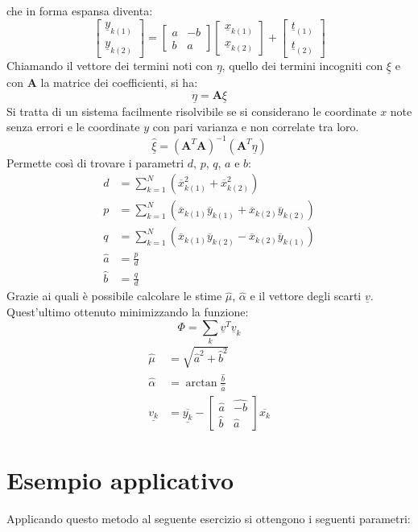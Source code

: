 che in forma espansa diventa:
\begin{equation}
	\begin{bmatrix}
		\underline{y}_{k(1)} \\ 
		\underline{y}_{k(2)}
	\end{bmatrix} 
	=
	\begin{bmatrix}
		{a} & {-b} \\ 
		{b} & {a}
	\end{bmatrix}
	\begin{bmatrix}
		\underline{x}_{k(1)} \\ 
		\underline{x}_{k(2)}
	\end{bmatrix}
	+
	\begin{bmatrix}
		\underline{t}_{(1)} \\ 
		\underline{t}_{(2)}
	\end{bmatrix}
\end{equation}
Chiamando il vettore dei termini noti con $\underline{\eta}$, quello dei termini incogniti con $\underline{\xi}$ e con $\mathbf{A}$ la matrice dei coefficienti, si ha:
\begin{equation}
	\underline{\eta}=\mathbf{A} \underline{\xi}
\end{equation}
Si tratta di un sistema facilmente risolvibile se si considerano le coordinate $x$ note senza errori e le coordinate $y$ con pari varianza e non correlate tra loro. 
\begin{equation}
	\hat{\underline{\xi}}=	
	\left(\mathbf{A}^T \mathbf{A}\right)^{-1}
	\left(\mathbf{A}^T \underline{\eta}\right)
\end{equation}
Permette così di trovare i parametri $d$, $p$, $q$, $a$ e $b$:
\begin{align} d &=\sum_{k=1}^{N}\left(\overline{x}_{k(1)}^{2}+\overline{x}_{k(2)}^{2}\right) \\ 
p &=\sum_{k=1}^{N}\left(\overline{x}_{k(1)} \overline{y}_{k(1)}+\overline{x}_{k(2)} \overline{y}_{k(2)}\right) \\ 
q &=\sum_{k=1}^{N}\left(\overline{x}_{k(1)} \overline{y}_{k(2)}-\overline{x}_{k(2)} \overline{y}_{k(1)}\right) \\
\hat{a} &= \frac{p}{d} \\
\hat{b} &= \frac{q}{d}
\end{align}
Grazie ai quali è possibile calcolare le stime $\hat{\mu}$, $\hat{\alpha}$ e il vettore degli scarti $\underline{v}$.
Quest'ultimo ottenuto minimizzando la funzione:
\begin{equation}
	\Phi = \sum_k \underline{v}^T\underline{v}_k
\end{equation}
\begin{align}
	\hat{\mu} &= \sqrt{\hat{a}^2 + \hat{b}^2}\\
	\hat{\alpha} &= \arctan\frac{\hat{b}}{\hat{a}}\\
	\underline{v_k} &= 
	\overline{\underline{y_{k}}}-
\begin{bmatrix}
	\hat{a} & \hat{-b} \\ 
	\hat{b} & \hat{a}
\end{bmatrix} 
\overline{x_{k}}
\end{align}
\section{Esempio applicativo}
Applicando questo metodo al seguente esercizio si ottengono i seguenti parametri:

	
